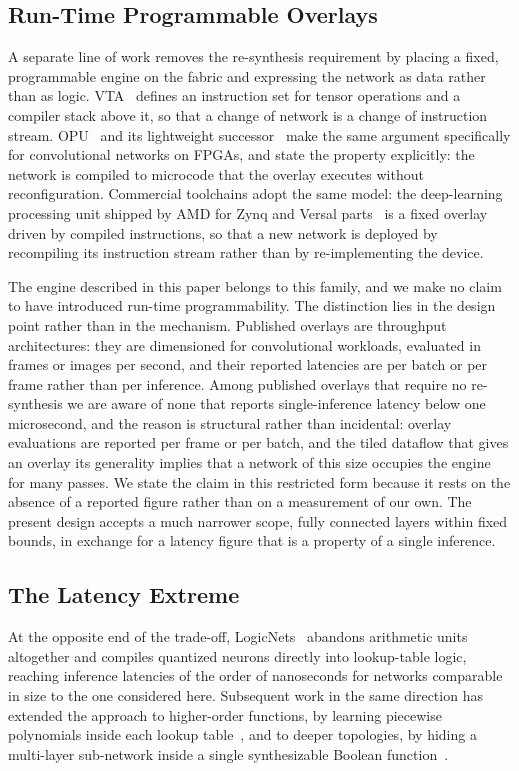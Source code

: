 \documentclass[final,5p,times,twocolumn]{elsarticle}
\begin{document}
\subsection{Run-Time Programmable Overlays}
\label{sec:overlays}
A separate line of work removes the re-synthesis requirement by placing a fixed,
programmable engine on the fabric and expressing the network as data rather than
as logic. VTA~\cite{Moreau2019} defines an instruction set for tensor operations
and a compiler stack above it, so that a change of network is a change of
instruction stream. OPU~\cite{Yu2020} and its lightweight
successor~\cite{YuLight2020} make the same argument specifically for
convolutional networks on FPGAs, and state the property explicitly: the network
is compiled to microcode that the overlay executes without reconfiguration.
Commercial toolchains adopt the same model: the deep-learning processing unit
shipped by AMD for Zynq and Versal parts~\cite{AMDVitisAI} is a fixed overlay
driven by compiled instructions, so that a new network is deployed by recompiling its instruction
stream rather than by re-implementing the device.

The engine described in this paper belongs to this family, and we make no claim
to have introduced run-time programmability. The distinction lies in the design
point rather than in the mechanism. Published overlays are throughput
architectures: they are dimensioned for convolutional workloads, evaluated in
frames or images per second, and their reported latencies are per batch or per
frame rather than per inference. Among published overlays that require no re-synthesis we are aware of none
that reports single-inference latency below one microsecond, and the reason is
structural rather than incidental: overlay evaluations are reported per frame or
per batch, and the tiled dataflow that gives an overlay its generality implies
that a network of this size occupies the engine for many passes. We state the
claim in this restricted form because it rests on the absence of a reported
figure rather than on a measurement of our own. The present design accepts a much narrower
scope, fully connected layers within fixed bounds, in exchange for a latency
figure that is a property of a single inference.

\subsection{The Latency Extreme}
At the opposite end of the trade-off, LogicNets~\cite{Umuroglu2020} abandons
arithmetic units altogether and compiles quantized neurons directly into
lookup-table logic, reaching inference latencies of the order of nanoseconds for
networks comparable in size to the one considered here. Subsequent work in the
same direction has extended the approach to higher-order functions, by learning
piecewise polynomials inside each lookup table~\cite{Andronic2023}, and to
deeper topologies, by hiding a multi-layer sub-network inside a single
synthesizable Boolean function~\cite{Andronic2024}.
\end{document}
